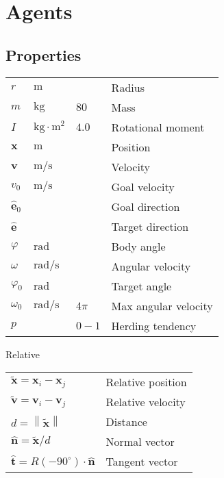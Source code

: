 \section{Agents}
\subsection{Properties}

\begin{tabular*}{1.0\linewidth}{llll}
\hline
\hline
$ r $                    & $ \mathrm{m} $ &  & Radius \\
$ m $                    & $ \mathrm{kg} $ & $ 80 $ & Mass \\
$ I $                    & $ \mathrm{kg \cdot m^{2}} $ & $ 4.0 $ & Rotational moment \\
\hline
\hline
$ \mathbf{x} $           & $ \mathrm{m} $ &  & Position \\
$ \mathbf{v} $           & $ \mathrm{m} / \mathrm{s} $ &  & Velocity \\
$ v_{0} $                & $ \mathrm{m} / \mathrm{s} $ &  & Goal velocity \\  
$ \hat{\mathbf{e}}_{0} $ &  &  & Goal direction \\
$ \hat{\mathbf{e}} $     &  &  & Target direction \\
\hline
\hline
$ \varphi $              & $ \mathrm{rad} $ &  & Body angle \\
$ \omega $               & $ \mathrm{rad} / \mathrm{s} $ &  & Angular velocity \\
$ \varphi_{0} $          & $ \mathrm{rad} $ &  & Target angle \\
$ \omega_{0} $           & $ \mathrm{rad} / \mathrm{s} $ & $ 4\pi $ & Max angular velocity \\
\hline
\hline
$ p $                    &  & $ 0 - 1 $ & Herding tendency \\
\hline
\hline
\end{tabular*}

Relative

\begin{tabular*}{1.0\linewidth}{ll}
\hline
\hline
$ \tilde{\mathbf{x}} = \mathbf{x}_{i} - \mathbf{x}_{j} $ & Relative position \\
$ \tilde{\mathbf{v}} = \mathbf{v}_{i} - \mathbf{v}_{j} $ & Relative velocity \\
$ d = \left\|\tilde{\mathbf{x}}\right\| $ & Distance\\
$ \hat{\mathbf{n}} = \tilde{\mathbf{x}} / d $ & Normal vector \\
$ \hat{\mathbf{t}} = R(-90^{\circ}) \cdot \hat{\mathbf{n}} $ & Tangent vector \\
\hline
\hline
\end{tabular*}


